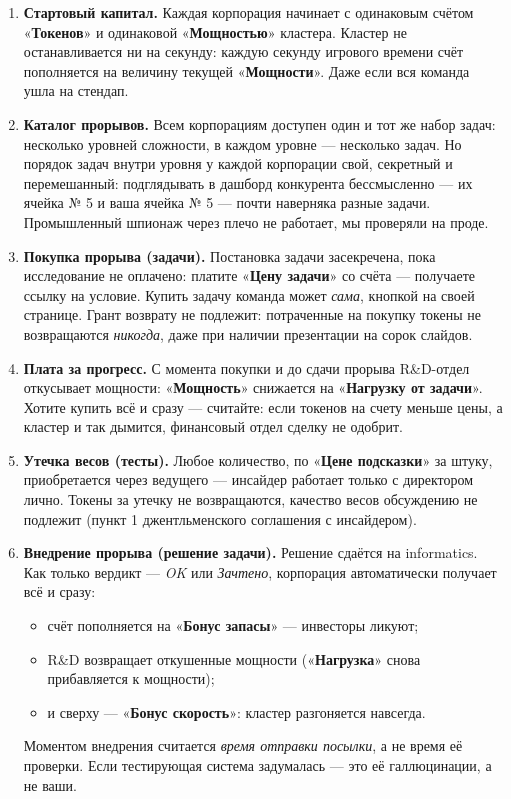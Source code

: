 \documentclass[12pt,a4paper]{article}
\newcommand{\term}[1]{«\textbf{#1}»}
\begin{document}
\begin{enumerate}[leftmargin=1.6em,itemsep=2pt]

\item \textbf{Стартовый капитал.} Каждая корпорация начинает с одинаковым
счётом \term{Токенов} и одинаковой \term{Мощностью} кластера. Кластер
не останавливается ни на секунду: каждую секунду игрового времени счёт
пополняется на величину текущей \term{Мощности}. Даже если вся команда
ушла на стендап.

\item \textbf{Каталог прорывов.} Всем корпорациям доступен один и тот же
набор задач: несколько уровней сложности, в каждом уровне --- несколько
задач. Но порядок задач внутри уровня у каждой корпорации свой, секретный
и перемешанный: подглядывать в дашборд конкурента бессмысленно ---
их ячейка № 5 и ваша ячейка № 5 --- почти наверняка разные задачи.
Промышленный шпионаж через плечо не работает, мы проверяли на проде.

\item \textbf{Покупка прорыва (задачи).} Постановка задачи засекречена,
пока исследование не оплачено: платите \term{Цену задачи} со счёта ---
получаете ссылку на условие. Купить задачу команда может \emph{сама},
кнопкой на своей странице. Грант возврату не подлежит: потраченные
на покупку токены не возвращаются \emph{никогда}, даже при наличии
презентации на сорок слайдов.

\item \textbf{Плата за прогресс.} С момента покупки и до сдачи прорыва
R\&D-отдел откусывает мощности: \term{Мощность} снижается
на \term{Нагрузку от задачи}. Хотите купить всё и сразу --- считайте:
если токенов на счету меньше цены, а кластер и так дымится,
финансовый отдел сделку не одобрит.

\item \textbf{Утечка весов (тесты).} Любое количество,
по \term{Цене подсказки} за штуку, приобретается через ведущего ---
инсайдер работает только с директором лично. Токены за утечку
не возвращаются, качество весов обсуждению не подлежит (пункт 1
джентльменского соглашения с инсайдером).

\item \textbf{Внедрение прорыва (решение задачи).} Решение сдаётся
на informatics. Как только вердикт --- \emph{OK} или \emph{Зачтено},
корпорация автоматически получает всё и сразу:
\begin{itemize}[itemsep=0pt]
	\item счёт пополняется на \term{Бонус запасы} --- инвесторы ликуют;
	\item R\&D возвращает откушенные мощности
	(\term{Нагрузка} снова прибавляется к мощности);
	\item и сверху --- \term{Бонус скорость}: кластер разгоняется навсегда.
\end{itemize}
Моментом внедрения считается \emph{время отправки посылки}, а не время
её проверки. Если тестирующая система задумалась --- это её галлюцинации,
а не ваши.


\end{enumerate}
\end{document}
